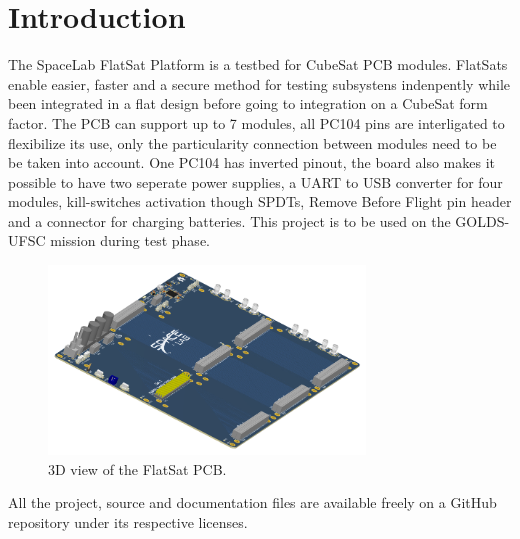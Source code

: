 %
%
%
%
%

%
%
%
%
%
%

\chapter{Introduction} \label{ch:introduction}

The SpaceLab FlatSat Platform is a testbed for CubeSat PCB modules. FlatSats enable easier, faster and a secure method for testing subsystens indenpently while been integrated in a flat design before going to integration on a CubeSat form factor. The PCB can support up to 7 modules, all PC104 pins are interligated to flexibilize its use, only the particularity connection between modules need to be be taken into account. One PC104 has inverted pinout, the board also makes it possible to have two seperate power supplies, a UART to USB converter for four modules, kill-switches activation though SPDTs, Remove Before Flight pin header and a connector for charging batteries. This project is to be used on the GOLDS-UFSC mission \cite{golds-ufsc} during test phase.

\begin{figure}[!ht]
    \begin{center}
        \includegraphics[width=0.75\textwidth]{figures/flatsat_perspective_image.png}
        \caption{3D view of the FlatSat PCB.}
        \label{fig:pcb-3d}
    \end{center}
\end{figure}

All the project, source and documentation files are available freely on a GitHub repository \cite{flatsat-platform-repo} under its respective licenses.